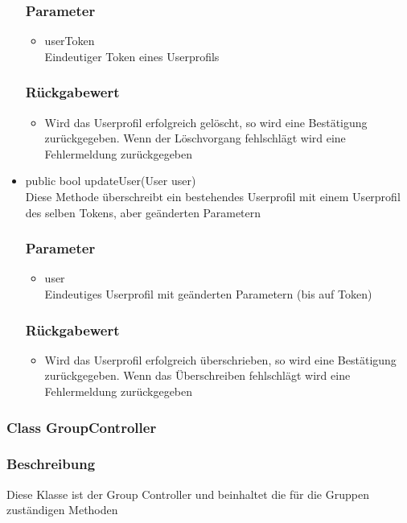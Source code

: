 \documentclass[a4paper]{scrreprt}
\begin{document}
\begin{addmargin}[25pt]{0pt}
\begin{itemize}
	\subsubsection*{Parameter}
	\begin{itemize}
	\item userToken \\
		Eindeutiger Token eines Userprofils
	\end{itemize}
	\subsubsection*{Rückgabewert}
	\begin{itemize}
	\item Wird das Userprofil erfolgreich gelöscht, so wird eine Bestätigung zurückgegeben. Wenn der Löschvorgang fehlschlägt wird eine Fehlermeldung zurückgegeben
	\end{itemize}


\item public bool updateUser(User user)\\
	Diese Methode überschreibt ein bestehendes Userprofil mit einem Userprofil des selben Tokens, aber geänderten Parametern
	\subsubsection*{Parameter}
	\begin{itemize}
	\item user \\
		Eindeutiges Userprofil mit geänderten Parametern (bis auf Token)
	\end{itemize}
	\subsubsection*{Rückgabewert}
	\begin{itemize}
	\item Wird das Userprofil erfolgreich überschrieben, so wird eine Bestätigung zurückgegeben. Wenn das Überschreiben fehlschlägt wird eine Fehlermeldung zurückgegeben
	\end{itemize}
\end{itemize}

\end{addmargin}

\subsubsection{Class GroupController}
\subsubsection*{Beschreibung}
Diese Klasse ist der Group Controller und beinhaltet die für die Gruppen zuständigen Methoden
\end{document}

